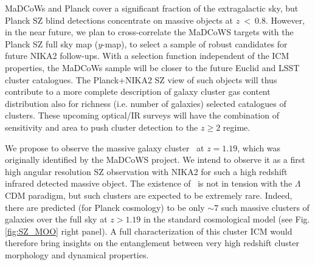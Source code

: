 \documentclass[11pt,a4paper,twoside,graphicx,color]{article}
\begin{document}
MaDCoWs and Planck cover a significant fraction of the extragalactic sky, but Planck SZ blind detections concentrate on massive objects at $z~<~$0.8. However, in the near future, we plan to cross-correlate the MaDCoWS targets with the Planck SZ full sky map ($y$-map), to select a sample of robust candidates for future NIKA2 follow-ups. With a selection function independent of the ICM properties, the MaDCoWs sample will be closer to the future Euclid and LSST cluster catalogues. The Planck+NIKA2 SZ view of such objects will thus contribute to a more complete description of galaxy cluster gas content distribution also for richness (i.e. number of galaxies) selected catalogues of clusters. These upcoming optical/IR surveys will have the combination of sensitivity and area to push cluster detection to the $z \geq 2$ regime.

We propose to observe the massive galaxy cluster \moo\ at $z = 1.19$, which was originally identified by the MaDCoWS project. We intend to observe it as a first high angular resolution SZ observation with NIKA2 for such a high redshift infrared detected massive object. The existence of \moo\ is not in tension with the $\Lambda$CDM paradigm, but such clusters are expected to be extremely rare. Indeed, there are predicted (for Planck cosmology) to be only $\sim 7$ such massive clusters of galaxies over the full sky at $z >1.19$ in the standard cosmological model (see Fig. \ref{fig:SZ_MOO} right panel). 
A full characterization of this cluster ICM would therefore bring insights on the entanglement between very high redshift cluster morphology and dynamical properties.
\end{document}

